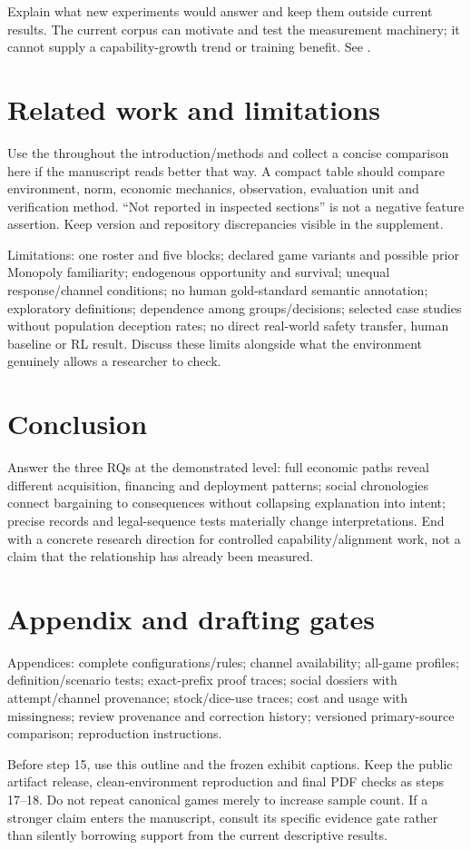 Explain what new experiments would answer and keep them outside current results. The current corpus can motivate and test the measurement machinery; it cannot supply a capability-growth trend or training benefit. See .

\section{Related work and limitations}
Use the  throughout the introduction/methods and collect a concise comparison here if the manuscript reads better that way. A compact table should compare environment, norm, economic mechanics, observation, evaluation unit and verification method. ``Not reported in inspected sections'' is not a negative feature assertion. Keep version and repository discrepancies visible in the supplement.

Limitations: one roster and five blocks; declared game variants and possible prior Monopoly familiarity; endogenous opportunity and survival; unequal response/channel conditions; no human gold-standard semantic annotation; exploratory definitions; dependence among groups/decisions; selected case studies without population deception rates; no direct real-world safety transfer, human baseline or RL result. Discuss these limits alongside what the environment genuinely allows a researcher to check.

\section{Conclusion}
Answer the three RQs at the demonstrated level: full economic paths reveal different acquisition, financing and deployment patterns; social chronologies connect bargaining to consequences without collapsing explanation into intent; precise records and legal-sequence tests materially change interpretations. End with a concrete research direction for controlled capability/alignment work, not a claim that the relationship has already been measured.

\section*{Appendix and drafting gates}
Appendices: complete configurations/rules; channel availability; all-game profiles; definition/scenario tests; exact-prefix proof traces; social dossiers with attempt/channel provenance; stock/dice-use traces; cost and usage with missingness; review provenance and correction history; versioned primary-source comparison; reproduction instructions.

Before step 15, use this outline and the frozen exhibit captions. Keep the public artifact release, clean-environment reproduction and final PDF checks as steps 17--18. Do not repeat canonical games merely to increase sample count. If a stronger claim enters the manuscript, consult its specific evidence gate rather than silently borrowing support from the current descriptive results.

